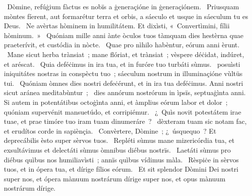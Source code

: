 \psalmChapterWithInscription{}
{ }
{%
~Dòmine, refúġium fàctus es nobïs a ġeneraçióne in ġeneraçiónem. 
~Priusquam mòntes fíerent, aut formarétur terra et orbis, a sáeculo et usque in sáeculum tu es Deus. 
~Ne avèrtas hòminem in humilitátem. Et dixìsti, «~Convertìmini, fílii hòminum.~»
~Quóniam mille anni ànte òculos tuos tàmquam dies hestèrna quae praeterívit, et custódia in nòcte. 
~Quae pro nìhilo habèntur, eórum anni èrunt. 
~Mane sicut herba trànsiat~; mane flóriat, et trànsiat~; vèspere déċidat, indúret, et aréscat. 
~Quia deféċimus in ira tua, et in furóre tuo turbáti sùmus. 
~posuìsti iniquitátes nostras in conspèctu tuo~; sáeculum nostrum in illuminaçióne vùltüs tui. 
~Quóniam òmnes dies nostri defeċérunt, et in ira tua deféċimus. Anni nostri sicut aránea meditabùntur~; 
~dies annórum nostrórum in ìpsïs, septuaġìnta anni. Si autem in potentátibus octoġìnta anni, et àmplius eórum labor et dolor~; quóniam supervénit mansuetúdo, et corripiémur. 
~¿~Quìs novit potestátem irae tuae, et prae timóre tuo iram tuam dinumeráre~? 
~dèxteram tuam sic notam fac, et erudítos corde in sapiènçia. 
~Convèrtere, Dòmine~; ¿~úsquequo~? Et deprecábilis èsto super sèrvos tuos. 
~Repléti sùmus mane mizericórdia tua, et exsultávimus et delectáti sùmus òmnibus diébus nostrïs. 
~Laetáti sùmus pro diébus quìbus nos humiliavìsti~; annïs quìbus vídimus màla. 
~Rèspiċe in sèrvos tuos, et in ópera tua, et dírige fílios eórum. 
~Et sit splendor Dòmini Dei nostri super nos, et ópera mànuum nostrárum dírige super nos, et opus mànuum nostrárum dírige. 
}
